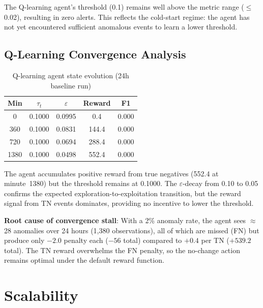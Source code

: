 The Q-learning agent's threshold (0.1) remains well above the metric range
($\leq$0.02), resulting in zero alerts. This reflects the cold-start regime:
the agent has not yet encountered sufficient anomalous events to learn
a lower threshold.

\subsection{Q-Learning Convergence Analysis}
\label{subsec:eval_threshold_convergence}

\begin{table}[H]
    \centering
    \small
    \begin{tabular}{|c|c|c|c|c|}
        \hline
        \textbf{Min} & \textbf{$\tau_t$} & \textbf{$\varepsilon$}
        & \textbf{Reward} & \textbf{F1} \\
        \hline
        0 & 0.1000 & 0.0995 & 0.4 & 0.000 \\
        360 & 0.1000 & 0.0831 & 144.4 & 0.000 \\
        720 & 0.1000 & 0.0694 & 288.4 & 0.000 \\
        1380 & 0.1000 & 0.0498 & 552.4 & 0.000 \\
        \hline
    \end{tabular}
    \caption{Q-learning agent state evolution (24h baseline run)}
    \label{tab:ql_convergence}
\end{table}

The agent accumulates positive reward from true negatives (552.4 at
minute~1380) but the threshold remains at 0.1000. The $\varepsilon$-decay
from 0.10 to 0.05 confirms the expected exploration-to-exploitation
transition, but the reward signal from TN events dominates, providing no
incentive to lower the threshold.

\textbf{Root cause of convergence stall}: With a 2\% anomaly rate, the agent
sees $\approx$28 anomalies over 24 hours (1,380 observations), all of which
are missed (FN) but produce only $-2.0$ penalty each ($-56$ total) compared
to $+0.4$ per TN ($+539.2$ total). The TN reward overwhelms the FN penalty,
so the no-change action remains optimal under the default reward function.

\section{Scalability}
\label{sec:eval_scalability}

